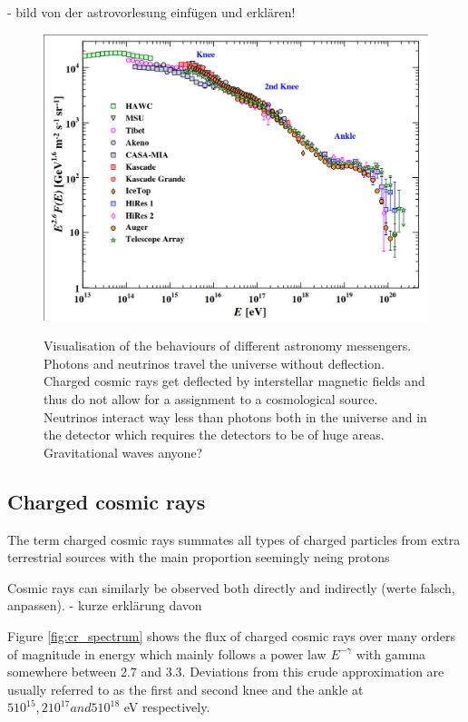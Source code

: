 - bild von der astrovorlesung einfügen und erklären!
\begin{figure}
	\includegraphics[width=.8\textwidth]{images/cr_spectrum.png}
	\label{fig:multi_messenger}
	\caption{Visualisation of the behaviours of different astronomy messengers. Photons and neutrinos 
		travel the universe without deflection. Charged cosmic rays get deflected by interstellar
		magnetic fields and thus do not allow for a assignment to a cosmological source.
		Neutrinos interact way less than photons both in the universe and in the detector 
		which requires the detectors to be of huge areas. Gravitational waves anyone?
	}
\end{figure}


\subsection{Charged cosmic rays}
The term charged cosmic rays summates all types of charged particles from
extra terrestrial sources with the main proportion seemingly neing protons
\cite{something something}


Cosmic rays can similarly be observed both directly and indirectly (werte falsch, anpassen).
- kurze erklärung davon


Figure \ref{fig:cr_spectrum} shows the flux of charged cosmic rays over 
many orders of magnitude in energy which mainly follows 
a power law $E^{-\gamma}$ with gamma somewhere between 
2.7 and 3.3. Deviations from this crude approximation are 
usually referred to as the first and second knee and the ankle 
at $5 10^{15}, 2 10^{17} and 5 10^{18}$ eV respectively.

